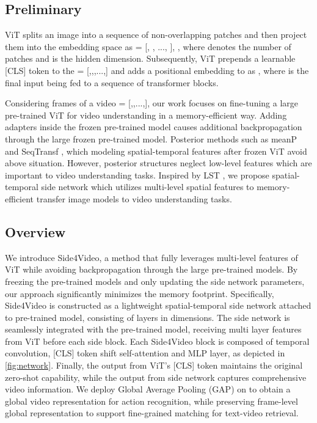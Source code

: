 \documentclass[10pt,twocolumn,letterpaper]{article}
\begin{document}
\subsection{Preliminary} 
\label{subsec: vit and motivation}
ViT splits an image   into a sequence of non-overlapping patches and then project them into the embedding space as  = [, , ..., ],   , where  denotes the number of patches and  is the hidden dimension. Subsequently, ViT prepends a learnable [CLS] token  to the  = [,,,...,] and adds a positional embedding  to  as , where  is the final input being fed to a sequence of transformer blocks.

Considering  frames  of a video  = [,,...,], our work focuses on fine-tuning a large pre-trained ViT for video understanding in a memory-efficient way. Adding adapters inside the frozen pre-trained model causes additional backpropagation through the large frozen pre-trained model. Posterior methods such as meanP \cite{clip4clip} and SeqTransf \cite{clip4clip}, which modeling spatial-temporal features after frozen ViT avoid above situation. However, posterior structures neglect low-level features which are important to video understanding tasks. Inspired by LST \cite{lst}, we propose spatial-temporal side network which utilizes multi-level spatial features to memory-efficient transfer image models to video understanding tasks.

\subsection{Overview }
\label{subsec: overview}
We introduce Side4Video, a method that fully leverages multi-level features of ViT while avoiding backpropagation through the large pre-trained models. By freezing the pre-trained models and only updating the side network parameters, our approach significantly minimizes the memory footprint. Specifically, Side4Video is constructed as a lightweight spatial-temporal side network attached to pre-trained model, consisting of  layers in  dimensions. The side network is seamlessly integrated with the pre-trained model, receiving multi layer features from ViT before each side block. Each Side4Video block is composed of temporal convolution, [CLS] token shift self-attention and MLP layer, as depicted in \cref{fig:network}. Finally, the output  from ViT's [CLS] token maintains the original zero-shot capability, while the output  from side network captures comprehensive video information. We deploy Global Average Pooling (GAP) on  to obtain a global video representation for action recognition, while preserving frame-level global representation to support fine-grained matching for text-video retrieval. 
\end{document}
